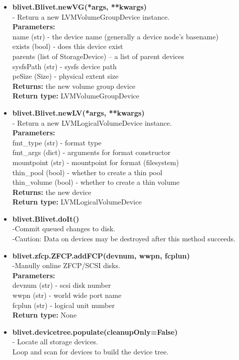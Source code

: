 \documentclass{article}
\begin{document}
\begin{itemize}
\item \textbf{blivet.Blivet.newVG(*args, **kwargs)}\\- Return a new LVMVolumeGroupDevice
instance.\\
	\textbf{Parameters:}	\\
    name (str) - the device name (generally a device node’s basename)\\
    exists (bool) - does this device exist\\
    parents (list of StorageDevice) – a list of parent devices\\
    sysfsPath (str) - sysfs device path\\
    peSize (Size) - physical extent size\\
    \textbf{Returns:}	the new volume group device\\
    \textbf{Return type:}	LVMVolumeGroupDevice\\
\item \textbf{blivet.Blivet.newLV(*args, **kwargs)}\\- Return a new LVMLogicalVolumeDevice
instance.\\
    \textbf{Parameters:}	\\
        fmt\_type (str) - format type\\
        fmt\_args (dict) - arguments for format constructor\\
        mountpoint (str) - mountpoint for format (filesystem)\\
        thin\_pool (bool) - whether to create a thin pool\\
        thin\_volume (bool) - whether to create a thin volume\\
    \textbf{Returns:}	the new device\\
    \textbf{Return type:}	LVMLogicalVolumeDevice\\
\item \textbf{blivet.Blivet.doIt()}\\-Commit queued changes to disk.\\-Caution: Data on
devices may be destroyed after this method succeeds.\\
\item \textbf{blivet.zfcp.ZFCP.addFCP(devnum, wwpn, fcplun)}\\-Manully online ZFCP/SCSI disks.\\
    \textbf{Parameters:}	\\
        devnum (str) - scsi disk number\\
        wwpn (str) - world wide port name\\
        fcplun (str) - logical unit number\\
    \textbf{Return type:}	None\\
\item \textbf{blivet.devicetree.populate(cleanupOnly=False)}\\- Locate all storage devices.\\
Loop and scan for devices to build the device tree.\\

\end{itemize}
\end{document}
